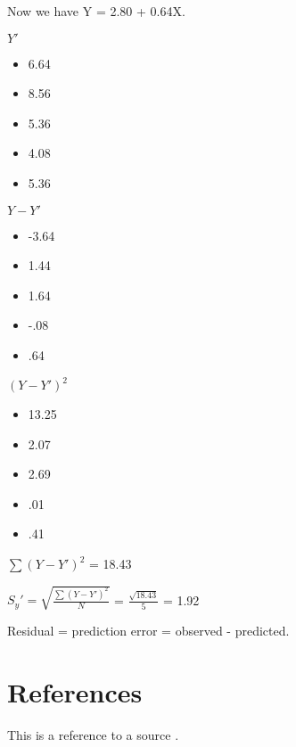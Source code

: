 \documentclass[11pt]{report}
\begin{document}
{    Now we have Y = 2.80 + 0.64X. \newline
    \begin{multicols}{3}
        $Y'$
        \begin{itemize}
            \item 6.64
            \item 8.56
            \item 5.36
            \item 4.08
            \item 5.36
        \end{itemize}
        \columnbreak
        $Y - Y'$
        \begin{itemize}
            \item -3.64
            \item 1.44
            \item 1.64
            \item -.08
            \item .64
        \end{itemize}
        \columnbreak
        $(Y - Y')^2$
        \begin{itemize}
            \item 13.25
            \item 2.07
            \item 2.69
            \item .01
            \item .41
        \end{itemize}
        $\sum(Y - Y')^2$ = 18.43
    \end{multicols}

    $S_y' = \sqrt{\frac{\sum(Y - Y')^2}{N}}$ = $\frac{\sqrt{18.43}}{5}$ = 1.92 \newline
}

Residual = prediction error = observed - predicted. \newline\newline 

\section{References}
This is a reference to a source \cite{example}.



\end{document}
